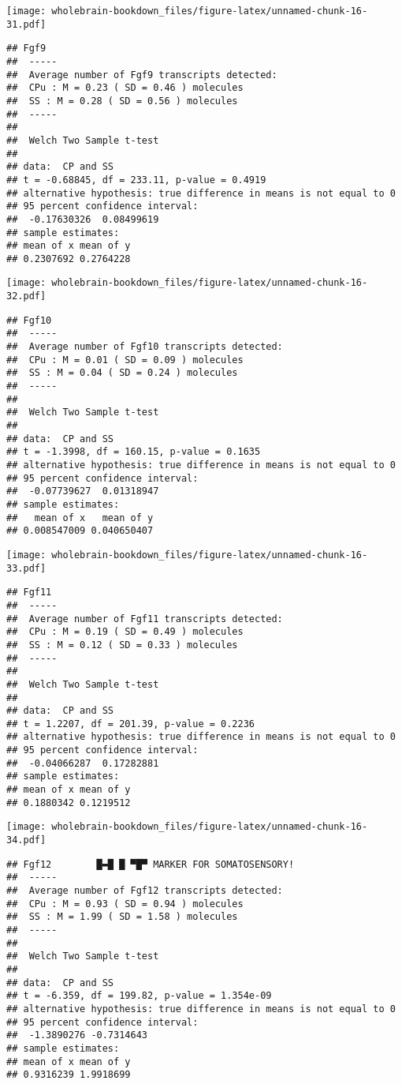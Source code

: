 \documentclass[]{book}
\theoremstyle{definition}
\theoremstyle{definition}
\theoremstyle{remark}
\begin{document}
\texttt{[image: wholebrain-bookdown\_files/figure-latex/unnamed-chunk-16-31.pdf]}

\begin{verbatim}
## Fgf9
##  -----
##  Average number of Fgf9 transcripts detected:
##  CPu : M = 0.23 ( SD = 0.46 ) molecules 
##  SS : M = 0.28 ( SD = 0.56 ) molecules
##  -----
## 
##  Welch Two Sample t-test
## 
## data:  CP and SS
## t = -0.68845, df = 233.11, p-value = 0.4919
## alternative hypothesis: true difference in means is not equal to 0
## 95 percent confidence interval:
##  -0.17630326  0.08499619
## sample estimates:
## mean of x mean of y 
## 0.2307692 0.2764228
\end{verbatim}

\texttt{[image: wholebrain-bookdown\_files/figure-latex/unnamed-chunk-16-32.pdf]}

\begin{verbatim}
## Fgf10
##  -----
##  Average number of Fgf10 transcripts detected:
##  CPu : M = 0.01 ( SD = 0.09 ) molecules 
##  SS : M = 0.04 ( SD = 0.24 ) molecules
##  -----
## 
##  Welch Two Sample t-test
## 
## data:  CP and SS
## t = -1.3998, df = 160.15, p-value = 0.1635
## alternative hypothesis: true difference in means is not equal to 0
## 95 percent confidence interval:
##  -0.07739627  0.01318947
## sample estimates:
##   mean of x   mean of y 
## 0.008547009 0.040650407
\end{verbatim}

\texttt{[image: wholebrain-bookdown\_files/figure-latex/unnamed-chunk-16-33.pdf]}

\begin{verbatim}
## Fgf11
##  -----
##  Average number of Fgf11 transcripts detected:
##  CPu : M = 0.19 ( SD = 0.49 ) molecules 
##  SS : M = 0.12 ( SD = 0.33 ) molecules
##  -----
## 
##  Welch Two Sample t-test
## 
## data:  CP and SS
## t = 1.2207, df = 201.39, p-value = 0.2236
## alternative hypothesis: true difference in means is not equal to 0
## 95 percent confidence interval:
##  -0.04066287  0.17282881
## sample estimates:
## mean of x mean of y 
## 0.1880342 0.1219512
\end{verbatim}

\texttt{[image: wholebrain-bookdown\_files/figure-latex/unnamed-chunk-16-34.pdf]}

\begin{verbatim}
## Fgf12        █▬█ █ ▀█▀ MARKER FOR SOMATOSENSORY!
##  -----
##  Average number of Fgf12 transcripts detected:
##  CPu : M = 0.93 ( SD = 0.94 ) molecules 
##  SS : M = 1.99 ( SD = 1.58 ) molecules
##  -----
## 
##  Welch Two Sample t-test
## 
## data:  CP and SS
## t = -6.359, df = 199.82, p-value = 1.354e-09
## alternative hypothesis: true difference in means is not equal to 0
## 95 percent confidence interval:
##  -1.3890276 -0.7314643
## sample estimates:
## mean of x mean of y 
## 0.9316239 1.9918699
\end{verbatim}
\end{document}
